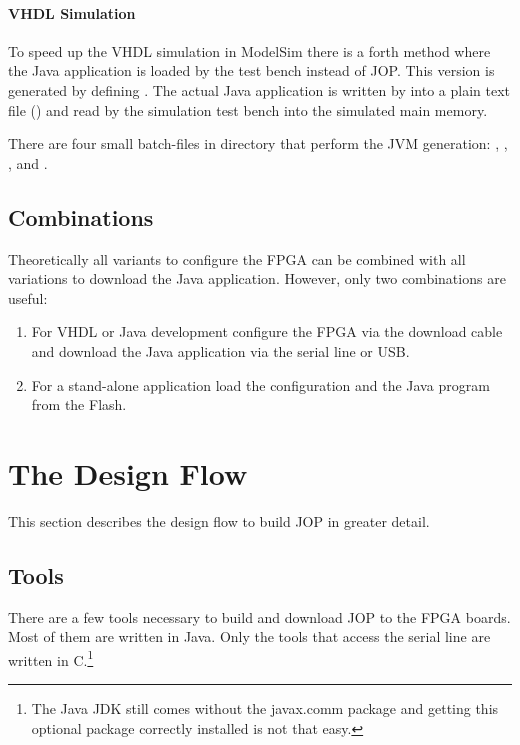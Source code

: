\paragraph{VHDL Simulation}

To speed up the VHDL simulation in ModelSim
there is a forth method where the Java application is loaded by the
test bench instead of JOP. This version is generated by defining
. The actual Java application is written by
 into a plain text file () and read
by the simulation test bench into the simulated main memory.

There are four small batch-files in directory  that
perform the JVM generation: , ,
, and .

\subsection{Combinations}

Theoretically all variants to configure the FPGA can be combined with
all variations to download the Java application. However, only two
combinations are useful:

\begin{enumerate}
    \item For VHDL or Java development configure the FPGA
    via the download cable and download the Java application
    via the serial line or USB.
    \item For a stand-alone application load the configuration and
    the Java program from the Flash.
\end{enumerate}



\section{The Design Flow}

This section describes the design flow to build JOP in greater
detail.

\subsection{Tools}

There are a few tools necessary to build and download JOP to the FPGA
boards. Most of them are written in Java. Only the tools that access
the serial line are written in C.\footnote{The Java JDK still comes
without the javax.comm package and getting this optional package
correctly installed is not that easy.}

